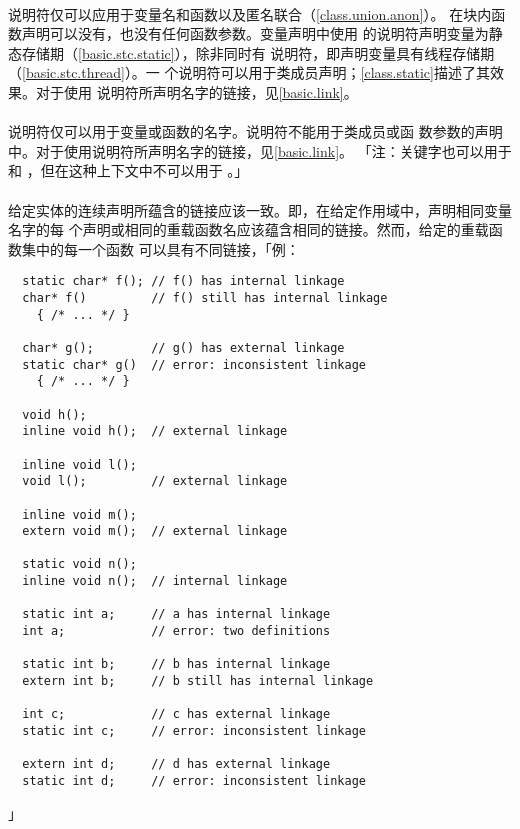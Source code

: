 \paragraph{}
说明符仅可以应用于变量名和函数以及匿名联合（\ref{class.union.anon}）。
在块内函数声明可以没有，也没有任何函数参数。变量声明中使用
的说明符声明变量为静态存储期（\ref{basic.stc.static}），除非同时有
说明符，即声明变量具有线程存储期（\ref{basic.stc.thread}）。一
个说明符可以用于类成员声明；\ref{class.static}描述了其效果。对于使用
说明符所声明名字的链接，见\ref{basic.link}。

\paragraph{}
说明符仅可以用于变量或函数的名字。说明符不能用于类成员或函
数参数的声明中。对于使用说明符所声明名字的链接，见\ref{basic.link}。
「注：关键字也可以用于和
，但在这种上下文中不可以用于
。」

\paragraph{}
给定实体的连续声明所蕴含的链接应该一致。即，在给定作用域中，声明相同变量名字的每
个声明或相同的重载函数名应该蕴含相同的链接。然而，给定的重载函数集中的每一个函数
可以具有不同链接，「例：
\begin{lstlisting}
  static char* f(); // f() has internal linkage
  char* f()         // f() still has internal linkage
    { /* ... */ }

  char* g();        // g() has external linkage
  static char* g()  // error: inconsistent linkage
    { /* ... */ }

  void h();
  inline void h();  // external linkage

  inline void l();
  void l();         // external linkage

  inline void m();
  extern void m();  // external linkage

  static void n();
  inline void n();  // internal linkage

  static int a;     // a has internal linkage
  int a;            // error: two definitions

  static int b;     // b has internal linkage
  extern int b;     // b still has internal linkage

  int c;            // c has external linkage
  static int c;     // error: inconsistent linkage

  extern int d;     // d has external linkage
  static int d;     // error: inconsistent linkage
\end{lstlisting}」

